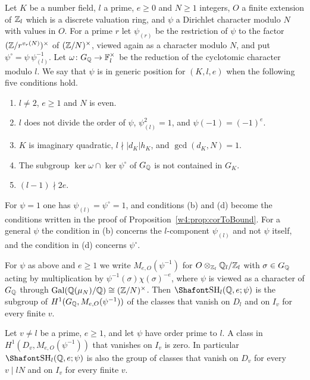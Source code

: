 \begin{definition}\label{w4:def:generic}
Let $K$ be a number field, $l$ a prime, $e\ge0$ and $N\ge1$ integers, $O$ a finite extension of $\mathbb Z_l$ which is a discrete valuation ring, and $\psi$ a Dirichlet character modulo $N$ with values in $O$. For a prime $r$ let $\psi_{(r)}$ be the restriction of $\psi$ to the factor $(\mathbb Z/r^{v_r(N)})^\times$ of $(\mathbb Z/N)^\times$, viewed again as a character modulo $N$, and put $\psi^\circ=\psi\,\psi_{(l)}^{-1}$. Let $\omega\colon G_\mathbb Q\to\mathbb F_l^\times$ be the reduction of the cyclotomic character modulo $l$. We say that $\psi$ is in generic position for $(K,l,e)$ when the following five conditions hold.
\begin{enumerate}[leftmargin=*,label=(\alph*)]
\item $l\ne2$, $e\ge1$ and $N$ is even.
\item $l$ does not divide the order of $\psi$, $\psi_{(l)}^2=1$, and $\psi(-1)=(-1)^e$.
\item $K$ is imaginary quadratic, $l\nmid\lvert d_K\rvert h_K$, and $\gcd(d_K,N)=1$.
\item The subgroup $\ker\omega\cap\ker\psi^\circ$ of $G_\mathbb Q$ is not contained in $G_K$.
\item $(l-1)\nmid2e$.
\end{enumerate}
\end{definition}

For $\psi=1$ one has $\psi_{(l)}=\psi^\circ=1$, and conditions (b) and (d) become the conditions written in the proof of Proposition~\ref{w4:prop:corToBound}. For a general $\psi$ the condition in (b) concerns the $l$-component $\psi_{(l)}$ and not $\psi$ itself, and the condition in (d) concerns $\psi^\circ$.

For $\psi$ as above and $e\ge1$ we write $M_{e,O}(\psi^{-1})$ for $O\otimes_{\mathbb Z_l}\mathbb Q_l/\mathbb Z_l$ with $\sigma\in G_\mathbb Q$ acting by multiplication by $\psi^{-1}(\sigma)\chi(\sigma)^{-e}$, where $\psi$ is viewed as a character of $G_\mathbb Q$ through $\operatorname{Gal}(\mathbb Q(\mu_N)/\mathbb Q)\cong(\mathbb Z/N)^\times$. Then $\Sha_l(\Q,e;\psi)$ is the subgroup of $H^1(G_\mathbb Q,M_{e,O}(\psi^{-1}))$ of the classes that vanish on $D_l$ and on $I_v$ for every finite $v$.

\begin{lemma}\label{w4:lem:unramchi}
Let $v\ne l$ be a prime, $e\ge1$, and let $\psi$ have order prime to $l$. A class in $H^1(D_v,M_{e,O}(\psi^{-1}))$ that vanishes on $I_v$ is zero. In particular $\Sha_l(\Q,e;\psi)$ is also the group of classes that vanish on $D_v$ for every $v\mid lN$ and on $I_v$ for every finite $v$.
\end{lemma}

